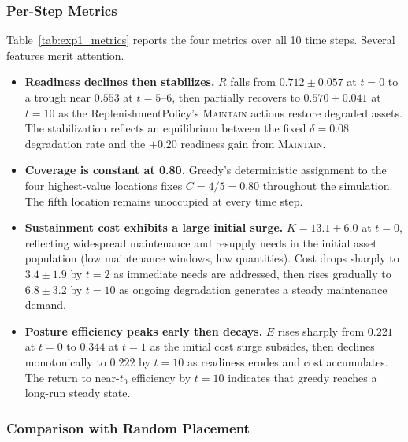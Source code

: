 \documentclass[11pt]{article}
\begin{document}
\subsubsection{Per-Step Metrics}

Table~\ref{tab:exp1_metrics} reports the four metrics over all 10 time
steps. Several features merit attention.

\begin{itemize}
    \item \textbf{Readiness declines then stabilizes.} $R$ falls from
    $0.712 \pm 0.057$ at $t = 0$ to a trough near $0.553$ at $t = 5$--$6$,
    then partially recovers to $0.570 \pm 0.041$ at $t = 10$ as the
    ReplenishmentPolicy's \textsc{Maintain} actions restore degraded assets.
    The stabilization reflects an equilibrium between the fixed $\delta = 0.08$
    degradation rate and the $+0.20$ readiness gain from \textsc{Maintain}.

    \item \textbf{Coverage is constant at 0.80.} Greedy's deterministic
    assignment to the four highest-value locations fixes $C = 4/5 = 0.80$
    throughout the simulation. The fifth location remains unoccupied at
    every time step.

    \item \textbf{Sustainment cost exhibits a large initial surge.}
    $K = 13.1 \pm 6.0$ at $t = 0$, reflecting widespread maintenance
    and resupply needs in the initial asset population (low maintenance
    windows, low quantities). Cost drops sharply to $3.4 \pm 1.9$ by
    $t = 2$ as immediate needs are addressed, then rises gradually to
    $6.8 \pm 3.2$ by $t = 10$ as ongoing degradation generates a
    steady maintenance demand.

    \item \textbf{Posture efficiency peaks early then decays.}
    $E$ rises sharply from $0.221$ at $t = 0$ to $0.344$ at $t = 1$
    as the initial cost surge subsides, then declines monotonically
    to $0.222$ by $t = 10$ as readiness erodes and cost accumulates.
    The return to near-$t_0$ efficiency by $t = 10$ indicates that
    greedy reaches a long-run steady state.
\end{itemize}



\subsubsection{Comparison with Random Placement}
\end{document}

